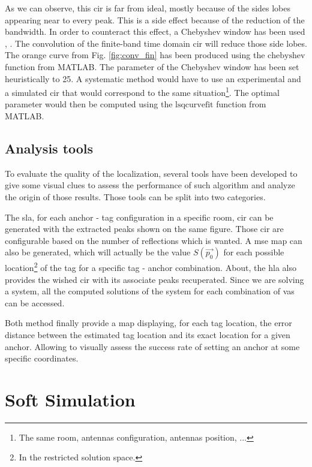 As we can observe, this \gls{cir} is far from ideal, mostly because of the sides lobes appearing near to every peak. This is a side effect because of the reduction of the bandwidth. In order to counteract this effect, a Chebyshev window has been used \cite{lynch1997dolph}, \cite{mathworks}. The convolution of the finite-band time domain \gls{cir} will reduce those side lobes. The orange curve from Fig. \ref{fig:conv_fin} has been produced using the $\text{chebyshev}$ function from MATLAB. The parameter of the Chebyshev window has been set heuristically to 25. A systematic method would have to use an experimental and a simulated \gls{cir} that would correspond to the same situation\footnote{The same room, antennas configuration, antennas position, ...}. The optimal parameter would then be computed using the $\text{lsqcurvefit}$ function from MATLAB.

\subsection{Analysis tools}

To evaluate the quality of the localization, several tools have been developed to give some visual clues to assess the performance of such algorithm and analyze the origin of those results. Those tools can be split into two categories.
\vspace{2mm}

The \gls{sla}, for each anchor - tag configuration in a specific room, \gls{cir} can be generated with the extracted peaks shown on the same figure. Those \gls{cir} are configurable based on the number of reflections which is wanted. A \gls{mse} map can also be generated, which will actually be the value $S(\vec{p_0})$ for each possible location\footnote{In the restricted solution space.} of the tag for a specific tag - anchor combination. About, the \gls{hla} also provides the wished \gls{cir} with its associate peaks recuperated. Since we are solving a system, all the computed solutions of the system for each combination of \glspl{va} can be accessed. 
\vspace{2mm}

Both method finally provide a map displaying, for each tag location, the error distance between the estimated tag location and its exact location for a given anchor. Allowing to visually assess the success rate of setting an anchor at some specific coordinates.

\section{Soft Simulation}
\label{soft_sim}

